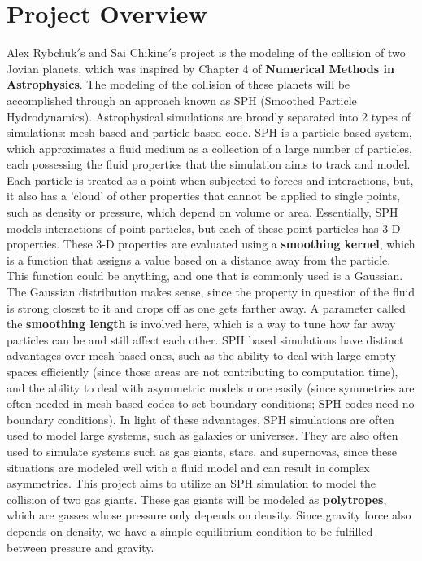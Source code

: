 \documentclass[12pt]{article}
\begin{document}
\section{Project Overview}  
Alex Rybchuk$'$s and Sai Chikine$'$s project is the modeling of the collision of two Jovian planets, which was inspired by Chapter 4 of \textbf{Numerical Methods in Astrophysics}. The modeling of the collision of these planets will be accomplished through an approach known as SPH (Smoothed Particle Hydrodynamics). Astrophysical simulations are broadly separated into 2 types of simulations: mesh based and particle based code. 
\newline \indent
SPH is a particle based system, which approximates a fluid medium as a collection of a large number of particles, each possessing the fluid properties that the simulation aims to track and model. Each particle is treated as a point when subjected to forces and interactions, but, it also has a 'cloud' of other properties that cannot be applied to single points, such as density or pressure, which depend on volume or area. Essentially, SPH models interactions of point particles, but each of these point particles has 3-D properties. These 3-D properties are evaluated using a \textbf{smoothing kernel}, which is a function that assigns a value based on a distance away from the particle. This function could be anything, and one that is commonly used is a Gaussian. The Gaussian distribution makes sense, since the property in question of the fluid is strong closest to it and drops off as one gets farther away. A parameter called the \textbf{smoothing length} is involved here, which is a way to tune how far away particles can be and still affect each other. SPH based simulations have distinct advantages over mesh based ones, such as the ability to deal with large empty spaces efficiently (since those areas are not contributing to computation time), and the ability to deal with asymmetric models more easily (since symmetries are often needed in mesh based codes to set boundary conditions; SPH codes need no boundary conditions). 
\newline  \indent
In light of these advantages, SPH simulations are often used to model large systems, such as galaxies or universes. They are also often used to simulate systems such as gas giants, stars, and supernovas, since these situations are modeled well with a fluid model and can result in complex asymmetries. This project aims to utilize an SPH simulation to model the collision of two gas giants. These gas giants will be modeled as \textbf{polytropes}, which are gasses whose pressure only depends on density. Since gravity force also depends on density, we have a simple equilibrium condition to be fulfilled between pressure and gravity.
\end{document}
